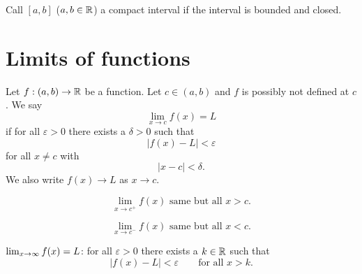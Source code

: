 \begin{definition}\label{def:compactinterval}
    Call $[a, b]$
    ($a, b \in \R$)
    a compact interval if the interval is bounded and closed.
\end{definition}

\section{Limits of functions}

\begin{definition}\label{def:limitfunction}
    Let $f : (a, b) \to \R$ be a function.
    Let $c \in (a, b)$ and $f$ is possibly not defined at $c$.
    We say
    \[
    \lim_{x \to c}f(x) = L
    \]
    if for all $\varepsilon > 0$ there exists a $\delta > 0$ such that
    \[
    |f(x) - L| < \varepsilon
    \]
    for all $x \neq c$ with
    \[
    |x - c| < \delta.
    \]
    We also write $f(x) \to L$ as $x \to c$.
\end{definition}

\begin{definition}\label{def:limitfromright}
    \[
    \lim_{x \to c ^ {+}}f(x) \text{ same but all } x > c.
    \]
\end{definition}


\begin{definition}\label{def:limitfromleft}
    \[
    \lim_{x \to c ^ {-}}f(x) \text{ same but all } x < c.
    \]
\end{definition}

\begin{definition}\label{def:infinlimit}
    $\liminfty[x] f(x) = L$:
    for all $\varepsilon > 0$ there exists a $k \in \R$ such that
    \[
    |f(x) - L| < \varepsilon\qquad\text{for all } x > k.
    \]
\end{definition}

